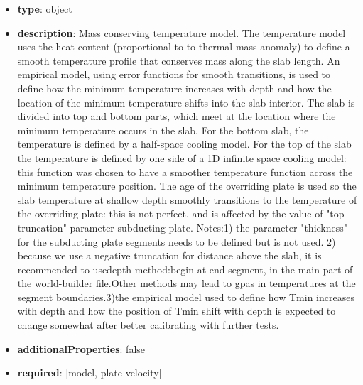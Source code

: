 \begin{itemize}[leftmargin=6em]\item {\bf type}: object
\item {\bf description}: Mass conserving temperature model. The temperature model uses the heat content (proportional to to thermal mass anomaly) to define a smooth temperature profile that conserves mass along the slab length. An empirical model, using error functions for smooth transitions, is used to  define how the minimum temperature increases with depth and how the location of the minimum temperature shifts into the slab interior. The slab is divided into top and bottom parts, which meet at the location where the minimum temperature occurs in the slab. For the bottom slab, the temperature is defined by a half-space cooling model. For the top of the slab the temperature is defined by one side of a 1D infinite space cooling model: this function was chosen to have a smoother temperature function across the minimum temperature position. The age of the overriding plate is used so the slab temperature at shallow depth smoothly transitions to the temperature of the overriding plate: this is not perfect, and is affected by the value of "top truncation" parameter subducting plate. Notes:1) the parameter "thickness" for the subducting plate segments needs to be defined but is not used. 2) because we use a negative truncation for distance above the slab, it is recommended to usedepth method:begin at end segment, in the main part of the world-builder file.Other methods may lead to gpas in temperatures at the segment boundaries.3)the empirical model used to define how Tmin increases with depth and how the position of Tmin shift with depth is expected to change somewhat after better calibrating with further tests.
\item {\bf additionalProperties}: false
\item {\bf required}: [model, plate velocity]\end{itemize}
